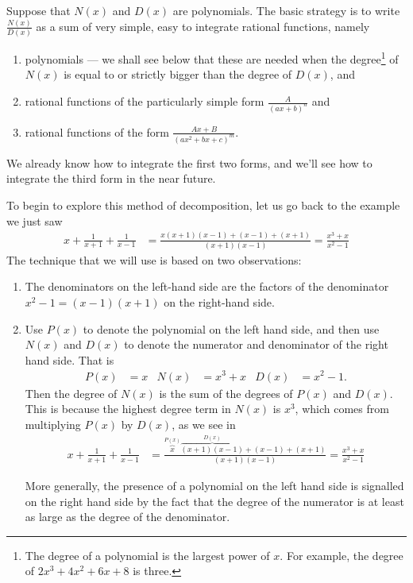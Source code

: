 Suppose that $N(x)$ and $D(x)$ are polynomials. The basic strategy is to write
$\frac{N(x)}{D(x)}$ as a sum of very simple, easy to integrate
rational functions, namely
\begin{enumerate}[(1)]
\item polynomials --- we shall see below that these are needed when the
degree\footnote{The degree of a polynomial is the largest power of $x$. For example, the
degree of $2x^3+4x^2+6x+8$ is three.} of $N(x)$ is equal to or strictly bigger than the
degree of  $D(x)$,  and
\item rational functions of the particularly simple form $\frac{A}{(ax+b)^n}$
and
\item rational functions of the form $\frac{Ax+B}{(ax^2+bx+c)^m}$.
\end{enumerate}
We already know how to integrate the first two forms, and we'll see how to integrate the
third form in the near future.

To begin to explore this method of decomposition, let us go back to the example we just
saw
\begin{align*}
x+\frac{1}{x+1} +\frac{1}{x-1}
&=\frac{x(x+1)(x-1) +(x-1) +(x+1)}{(x+1)(x-1)}
=\frac{x^3+x}{x^2-1}
\end{align*}
The technique that we will use is based on two observations:
\begin{enumerate}[(1)]
\item
The denominators on the left-hand side are the factors of the denominator
$x^2-1=(x-1)(x+1)$ on the right-hand side.
\item Use $P(x)$ to denote the polynomial on the left hand side, and then use $N(x)$ and
$D(x)$ to denote the numerator and denominator of the right hand side. That is
\begin{align*}
  P(x)&=x & N(x)&= x^3+x & D(x)&= x^2-1.
\end{align*}
Then the degree of $N(x)$ is the sum of the degrees of $P(x)$ and $D(x)$. This is because
the highest degree term in $N(x)$ is $x^3$, which comes from multiplying $P(x)$ by $D(x)$,
as we see in
\begin{align*}
    x + \frac{1}{x+1} + \frac{1}{x-1}
  &=\frac{   \overbrace{x}^{P(x)}
	      \overbrace{(x+1)(x-1)}^{D(x)}
	      + (x-1) + (x+1)  }
	      {(x+1)(x-1)}
    =\frac{x^3+x}{x^2-1}
\end{align*}

More generally, the presence of a polynomial on the left hand side
is signalled on the right hand side by the fact that the degree of the
numerator is at least as large as the degree of the denominator.
\end{enumerate}

